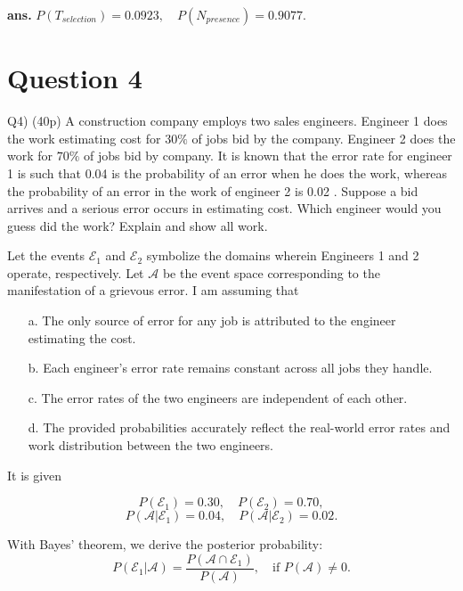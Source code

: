 \documentclass[12pt]{article}
\begin{document}
\vfill
\begin{flushright}
\textbf{ans.} \(P(T_{selection})=0.0923, \quad  P(N_{presence}) = 0.9077.\)
\end{flushright}

\newpage
\section*{Question 4}
\begin{q}
Q4) (40p) A construction company employs two sales engineers. Engineer 1 does the work estimating cost for \(30 \%\) of jobs bid by the company. Engineer 2 does the work for \(70 \%\) of jobs bid by company. It is known that the error rate for engineer 1 is such that 0.04 is the probability of an error when he does the work, whereas the probability of an error in the work of engineer 2 is 0.02 . Suppose a bid arrives and a serious error occurs in estimating cost. Which engineer would you guess did the work? Explain and show all work.
\end{q}

Let the events \( \mathcal{E}_1 \) and \( \mathcal{E}_2 \) symbolize the domains wherein Engineers 1 and 2 operate, respectively. Let \( \mathcal{A} \) be the event space corresponding to the manifestation of a grievous error. I am assuming that

\begin{itemize}
\item[a.] The only source of error for any job is attributed to the engineer estimating the cost.
\item[b.] Each engineer's error rate remains constant across all jobs they handle.
\item[c.] The error rates of the two engineers are independent of each other.
\item[d.] The provided probabilities accurately reflect the real-world error rates and work distribution between the two engineers.
\end{itemize}

It is given

\[
P(\mathcal{E}_1) = 0.30, \quad P(\mathcal{E}_2) = 0.70,
\]
\[
P(\mathcal{A}|\mathcal{E}_1) = 0.04, \quad P(\mathcal{A}|\mathcal{E}_2) = 0.02.
\]

With Bayes' theorem, we derive the posterior probability:
\[
P(\mathcal{E}_1|\mathcal{A}) = \frac{P(\mathcal{A} \cap \mathcal{E}_1)}{P(\mathcal{A})}, \quad \text{if } P(\mathcal{A}) \neq 0.
\]
\end{document}
